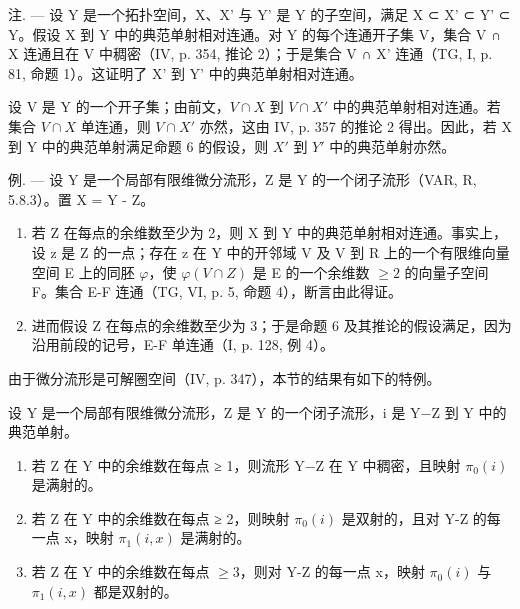 注. --- 设 Y 是一个拓扑空间，X、X' 与 Y' 是 Y 的子空间，满足 X ⊂ X' ⊂ Y' ⊂ Y。假设 X 到 Y 中的典范单射相对连通。对 Y 的每个连通开子集 V，集合 V ∩ X 连通且在 V 中稠密（IV, p. 354, 推论 2）；于是集合 V ∩ X' 连通（TG, I, p. 81, 命题 1）。这证明了 X' 到 Y' 中的典范单射相对连通。

设 V 是 Y 的一个开子集；由前文，\(V \cap X\) 到 \(V \cap X'\) 中的典范单射相对连通。若集合 \(V \cap X\) 单连通，则 \(V \cap X'\) 亦然，这由 IV, p. 357 的推论 2 得出。因此，若 X 到 Y 中的典范单射满足命题 6 的假设，则 \(X'\) 到 \(Y'\) 中的典范单射亦然。

例. --- 设 Y 是一个局部有限维微分流形，Z 是 Y 的一个闭子流形（VAR, R, 5.8.3）。置 X = Y - Z。

\begin{enumerate}
\def\labelenumi{\alph{enumi})}
\item
  若 Z 在每点的余维数至少为 2，则 X 到 Y 中的典范单射相对连通。事实上，设 z 是 Z 的一点；存在 z 在 Y 中的开邻域 V 及 V 到 R 上的一个有限维向量空间 E 上的同胚 \(\varphi\)，使 \(\varphi(V \cap Z)\) 是 E 的一个余维数 \(\geqslant 2\) 的向量子空间 F。集合 E-F 连通（TG, VI, p. 5, 命题 4），断言由此得证。
\item
  进而假设 Z 在每点的余维数至少为 3；于是命题 6 及其推论的假设满足，因为沿用前段的记号，E-F 单连通（I, p. 128, 例 4）。
\end{enumerate}

由于微分流形是可解圈空间（IV, p. 347），本节的结果有如下的特例。

设 Y 是一个局部有限维微分流形，Z 是 Y 的一个闭子流形，i 是 Y−Z 到 Y 中的典范单射。

\begin{enumerate}
\def\labelenumi{\alph{enumi})}
\item
  若 Z 在 Y 中的余维数在每点 ≥ 1，则流形 Y−Z 在 Y 中稠密，且映射 \(\pi_{0}(i)\) 是满射的。
\item
  若 Z 在 Y 中的余维数在每点 ≥ 2，则映射 \(\pi_{0}(i)\) 是双射的，且对 Y-Z 的每一点 x，映射 \(\pi_{1}(i,x)\) 是满射的。
\item
  若 Z 在 Y 中的余维数在每点 \(\geqslant 3\)，则对 Y-Z 的每一点 x，映射 \(\pi_{0}(i)\) 与 \(\pi_{1}(i,x)\) 都是双射的。
\end{enumerate}

